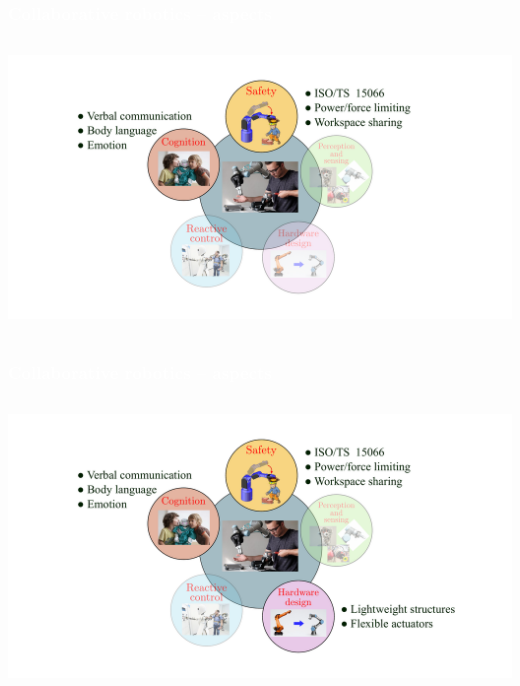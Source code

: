 \begin{frame}[noframenumbering]
  \frametitle{{\textcolor{white}{\hspace{0.3cm}Collaborative robotics -- aspects}}}


\begin{columns}

\column{1.2\paperwidth}

\hspace{-15mm}              
\includegraphics[width=1.2\paperwidth]{figures/3.pdf}
  

\end{columns}




\end{frame}


\begin{frame}[noframenumbering]
  \frametitle{{\textcolor{white}{\hspace{0.3cm}Collaborative robotics -- aspects}}}


\begin{columns}

\column{1.2\paperwidth}

\hspace{-15mm}               
\includegraphics[width=1.2\paperwidth]{figures/4.pdf}
     

\end{columns}




\end{frame}


